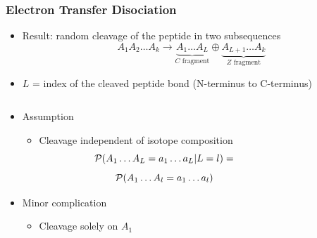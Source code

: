 \documentclass[xetex]{beamer}
\begin{document}
	\begin{frame}\frametitle{Electron Transfer Disociation}
		\begin{itemize}
			\item Result: random cleavage of the peptide in two subsequences
			$$ A_1 A_2 \dots A_k \rightarrow 
				\underbrace{A_1 \dots A_L}_\text{$C$ fragment}  \oplus \underbrace{A_{L+1} \dots A_k}_\text{$Z$ fragment}$$
			\item $L$ = index of the cleaved peptide bond (N-terminus to C-terminus) 					
		\end{itemize}

		\begin{columns}
			\begin{column}[t]{.5\textwidth}
				\begin{itemize}
					\item Assumption
				\begin{itemize}
					\item Cleavage independent of isotope composition
					$$ \mathcal{P}( A_1 \dots A_L = a_1 \dots a_L | L=l ) = 
					$$
					$$ \mathcal{P}( A_1 \dots A_l = a_1 \dots a_l)$$
				\end{itemize}
					\item Minor complication
					\begin{itemize}
						\item Cleavage solely on $A_1$ 
					\end{itemize}
				\end{itemize}
			\end{column}
			\begin{column}[t]{.5\textwidth}
				\begin{center}

\end{center}
\end{column}
\end{columns}
\end{frame}
\end{document}
